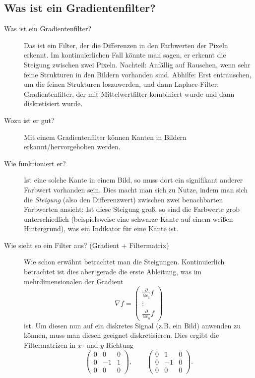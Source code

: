 \subsection{Was ist ein Gradientenfilter?}
\begin{description}
  \item[Was ist ein Gradientenfilter?]
    Das ist ein Filter, der die Differenzen in den Farbwerten der Pixeln erkennt. Im 
    kontinuierlichen Fall könnte man sagen, er erkennt die Steigung zwischen zwei Pixeln.
    Nachteil: Anfällig auf Rauschen, wenn sehr feine Strukturen in den Bildern vorhanden sind.
    Abhilfe: Erst entrauschen, um die feinen Strukturen loszuwerden, und dann 
    Laplace-Filter: Gradientenfilter, der mit Mittelwertfilter kombiniert wurde und dann 
    diskretisiert wurde.
	\item[Wozu ist er gut?]
      Mit einem Gradientenfilter können Kanten in Bildern erkannt/hervorgehoben werden.
	\item[Wie funktioniert er?]
      Ist eine solche Kante in einem Bild, so muss dort ein signifikant anderer Farbwert
      vorhanden sein. Dies macht man sich zu Nutze, indem man sich die \emph{Steigung} (also
      den Differenzwert) zwischen
      zwei benachbarten Farbwerten ansieht: Ist diese Steigung groß, so sind die Farbwerte
      grob unterschiedlich (beispielsweise eine schwarze Kante auf einem weißen Hintergrund),
      was ein Indikator für eine Kante ist.
	\item[Wie sieht so ein Filter aus? (Gradient + Filtermatrix)]
      Wie schon erwähnt betrachtet man die Steigungen. Kontinuierlich betrachtet ist dies
      aber gerade die erste Ableitung, was im mehrdimensionalen der Gradient
      $$ \nabla f = \begin{pmatrix} \frac{\partial}{\partial x_1}f\\ \vdots\\ \frac{\partial}{\partial x_n}f \end{pmatrix} $$
      ist. Um diesen nun auf ein diskretes Signal (z.B. ein Bild) anwenden zu können, muss
      man diesen geeignet diskretisieren. Dies ergibt die Filtermatrizen in $x$- und $y$-Richtung
      $$ 
      \begin{pmatrix}0&0&0\\0&-1&1\\0&0&0\end{pmatrix},\qquad\begin{pmatrix}0&1&0\\0&-1&0\\0&0&0\end{pmatrix}.
$$
\end{description}
